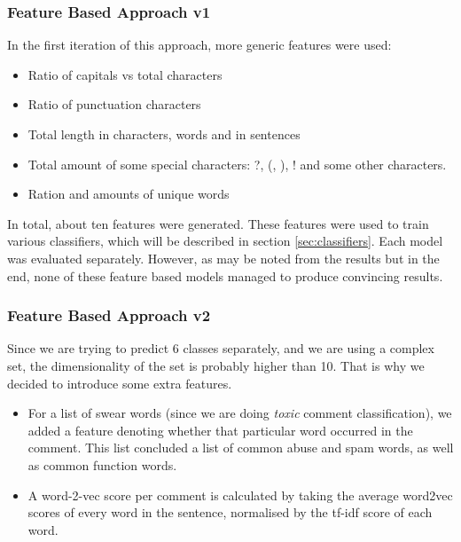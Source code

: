 \documentclass[10pt, a4paper]{article}
\begin{document}
\begin{multicols}{2}
		\subsubsection{Feature Based Approach v1}
		In the first iteration of this approach, more generic features were used:
		\begin{itemize}
			\setlength\itemsep{0px}
			\item Ratio of capitals vs total characters
			\item Ratio of punctuation characters
			\item Total length in characters, words and in sentences
			\item Total amount of some special characters: ?, (, ), ! and some other characters.
			\item Ration and amounts of unique words		
		\end{itemize}
		In total, about ten features were generated. These features were used to train various classifiers, which will be described in section \ref{sec:classifiers}. Each model was evaluated separately. However, as may be noted from the results but in the end, none of these feature based models managed to produce convincing results.
		
		
		\subsubsection{Feature Based Approach v2}
		
		
		Since we are trying to predict 6 classes separately, and we are using a  complex set, the dimensionality of the set is probably higher than 10. That is why we decided to introduce some extra features.
		
		\begin{itemize}
			\item For a list of swear words (since we are doing \emph{toxic} comment classification), we added a feature denoting whether that particular word occurred in the comment. This list concluded a list of common abuse and spam words, as well as common function words.
			\item  A word-2-vec score per comment is calculated by taking the average word2vec scores of every word in the sentence, normalised by the tf-idf score of each word.
		\end{itemize}
		

\end{multicols}
\end{document}
